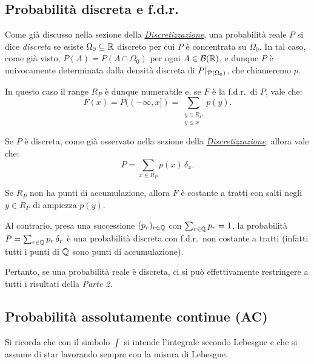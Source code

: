 \begin{multicols*}{2}
\subsection{Probabilità discreta e f.d.r.}

Come già discusso nella sezione della \textit{\hyperref[sec:discretizzazione]{Discretizzazione}},
una probabilità reale $P$ si dice \textit{discreta} se esiste $\Omega_0 \subseteq \mathbb{R}$
discreto per cui $P$ è concentrata su $\Omega_0$. In tal caso, come già visto,
$P(A) = P(A \cap \Omega_0)$ per ogni $A \in \mathcal{B}(\mathbb{R})$, e dunque $P$ è univocamente determinata
dalla densità discreta di $P\arrowvert_{\mathcal{P}(\Omega_0)}$, che chiameremo $p$. \smallskip


In questo caso il range $R_P$ è dunque numerabile e, se $F$ è la f.d.r.~di $P$, vale che:
\[
    F(x) = P((-\infty, x]) = \sum_{\substack{y \in R_P \\ y \leq x}} p(y).
\]

\begin{remark}
    Se $P$ è discreta, come già osservato nella sezione della \textit{\hyperref[remark:identità_discreta_dirac]{Discretizzazione}},
    allora vale che:
    \[
        P = \sum_{x \in R_P} p(x) \, \delta_x.
    \]
\end{remark}

\begin{remark}
    Se $R_P$ non ha punti di accumulazione, allora $F$ è costante a tratti con salti
    negli $y \in R_P$ di ampiezza $p(y)$. \smallskip


    Al contrario, presa una successione $(p_r)_{r \in \mathbb{Q}}$ con $\sum_{r \in \mathbb{Q}} p_r = 1$,
    la probabilità $P = \sum_{r \in \mathbb{Q}} p_r \, \delta_r$ è una probabilità discreta con
    f.d.r.~non costante a tratti (infatti tutti i punti di $\mathbb{Q}$ sono punti di accumulazione). 
\end{remark}

Pertanto, se una probabilità reale è discreta, ci si può effettivamente restringere a tutti
i risultati della \textit{Parte 2}.

\subsection{Probabilità assolutamente continue (AC)}

\begin{warn}
    Si ricorda che con il simbolo $\int$ si intende l'integrale
    secondo Lebesgue e che si assume di star lavorando sempre con la
    misura di Lebesgue.
\end{warn}

\end{multicols*}
